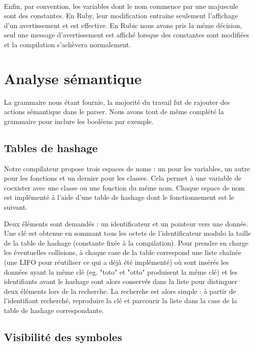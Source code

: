 \documentclass[12pt]{article}
\begin{document}
\paragraph{}
Enfin, par convention, les variables dont le nom commence par une majuscule sont des constantes. En Ruby, leur modification entraine seulement l'affichage d'un avertissement et est effective. En Rubic nous avons pris la même décision, seul une message d'avertissement est affiché lorsque des constantes sont modifiées et la compilation s'achèvera normalement.


\section{Analyse sémantique}

La grammaire nous étant fournie, la mojorité du travail fut de rajouter des
actions sémantique dans le parser. Nous avons tout de même complété la
grammaire pour inclure les booléens par exemple.

\subsection{Tables de hashage}

Notre compilateur propose trois espaces de noms : un pour les
variables, un autre pour les fonctions et un dernier pour les classes. Cela
permet à une variable de coexister avec une classe ou une fonction du même
nom. Chaque espace de nom est implémenté à l'aide d'une table de hashage dont
le fonctionnement est le suivant.

Deux éléments sont demandés : un identificateur et un pointeur vers une donnée.
Une clé est obtenue en sommant tous les octets de l'identificateur modulo la
taille de la table de hashage (constante fixée à la compilation). Pour prendre
en charge les éventuelles collisions, à chaque case de la table correspond une
liste chaînée (une LIFO pour réutiliser ce qui a déjà été implémenté) où sont
insérés les données ayant la même clé (eg. "toto" et "otto" produisent la même
clé) et les identifiants avant le hashage sont alors conservés dans la liste
pour distinguer deux éléments lors de la recherche. La recherche est alors
simple : à partir de l'identifiant recherché, reproduire la clé et parcourir
la liste dans la case de la table de hashage correspondante.


\subsection{Visibilité des symboles}
\end{document}
